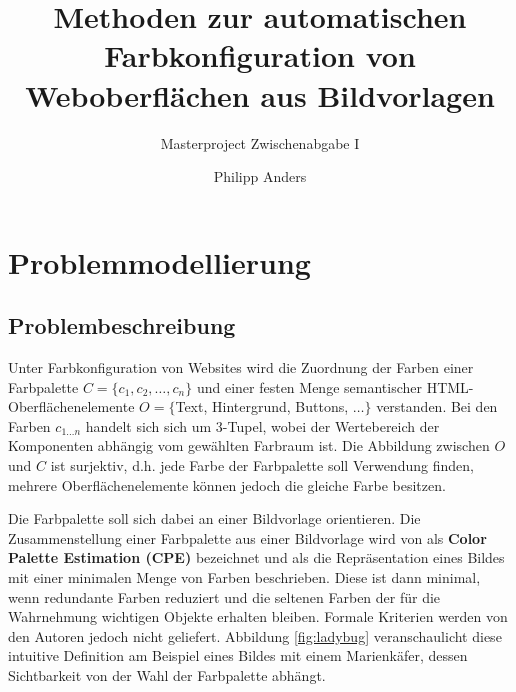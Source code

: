 \documentclass[10pt,a4paper,bibliography=totoc,twocolumn]{scrartcl}
\begin{document}
\title{Methoden zur automatischen Farbkonfiguration von Weboberflächen aus Bildvorlagen}
\subtitle{Masterproject Zwischenabgabe I}
\author{Philipp Anders}



\section{Problemmodellierung}

\subsection{Problembeschreibung}
\label{sec:modellierung}
Unter Farbkonfiguration von Websites wird die Zuordnung der Farben einer Farbpalette $C = \{c_1, c_2, \ldots, c_n\}$ und einer festen Menge semantischer HTML-Oberflächenelemente $O = \{$Text, Hintergrund, Buttons, $\ldots \}$ verstanden. Bei den Farben $c_{1 \ldots n}$ handelt sich sich um 3-Tupel, wobei der Wertebereich der Komponenten abhängig vom gewählten Farbraum ist. Die Abbildung zwischen $O$ und $C$ ist surjektiv, d.h. jede Farbe der Farbpalette soll Verwendung finden, mehrere Oberflächenelemente können jedoch die gleiche Farbe besitzen.

Die Farbpalette soll sich dabei an einer Bildvorlage orientieren. Die Zusammenstellung einer Farbpalette aus einer Bildvorlage wird von \citet{acopa} als \textbf{Color Palette Estimation (CPE)} bezeichnet und als die Repräsentation eines Bildes mit einer minimalen Menge von Farben beschrieben. Diese ist dann minimal, wenn redundante Farben reduziert und die seltenen Farben der für die Wahrnehmung wichtigen Objekte erhalten bleiben. Formale Kriterien werden von den Autoren jedoch nicht geliefert. Abbildung \ref{fig:ladybug} veranschaulicht diese intuitive Definition am Beispiel eines Bildes mit einem Marienkäfer, dessen Sichtbarkeit von der Wahl der Farbpalette abhängt.
\end{document}
